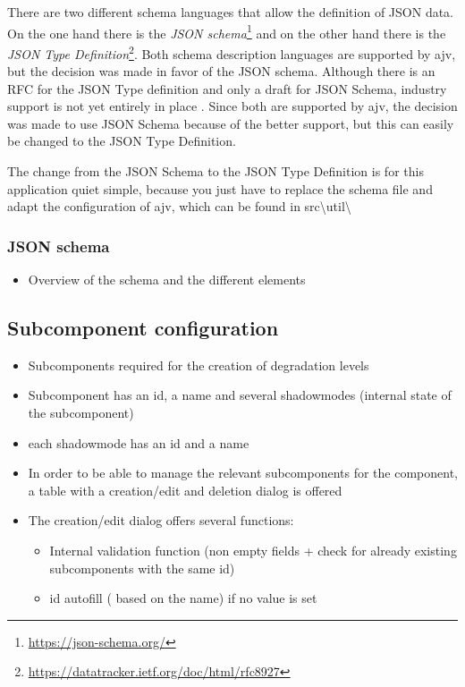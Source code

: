 There are two different schema languages that allow the definition of JSON data. On the one hand there is the \textit{JSON schema}\footnote{\url{https://json-schema.org/}} and on the other hand there is the \textit{JSON Type Definition}\footnote{\url{https://datatracker.ietf.org/doc/html/rfc8927}}. Both schema description languages are supported by ajv, but the decision was made in favor of the JSON schema. Although there is an RFC for the JSON Type definition and only a draft for JSON Schema, industry support is not yet entirely in place \cite{ajv_comparison}. Since both are supported by ajv, the decision was made to use JSON Schema because of the better support, but this can easily be changed to the JSON Type Definition.

The change from the JSON Schema to the JSON Type Definition is for this application quiet simple, because you just have to replace the schema file and adapt the configuration of ajv, which can be found in src\textbackslash util\textbackslash

\subsubsection{JSON schema}
\begin{itemize}
    \item Overview of the schema and the different elements
\end{itemize}

\subsection{Subcomponent configuration}
\begin{itemize}
    \item Subcomponents required for the creation of degradation levels
    \item Subcomponent has an id, a name and several shadowmodes (internal state of the subcomponent)
    \item each shadowmode has an id and a name 
    \item In order to be able to manage the relevant subcomponents for the component, a table with a creation/edit and deletion dialog is offered
    \item The creation/edit dialog offers several functions: 
        \begin{itemize}
            \item Internal validation function (non empty fields + check for already existing subcomponents with the same id)
            \item id autofill ( based on the name) if no value is set
        \end{itemize}
\end{itemize}

